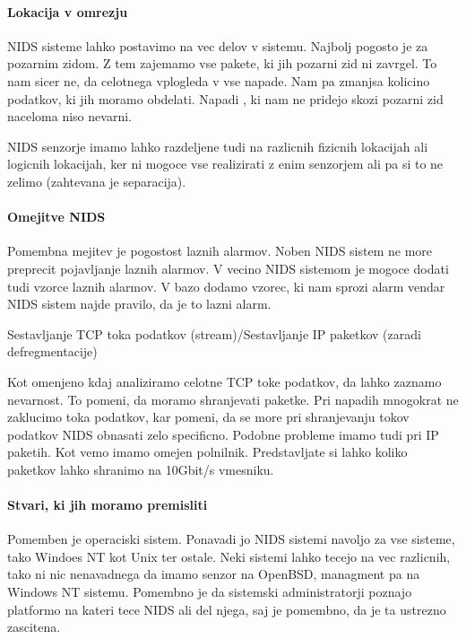 \documentclass[12pt]{article}
\begin{document}
\paragraph{Lokacija v omrezju} %
\label{par:Lokacija v omrezju}

NIDS sisteme lahko postavimo na vec delov v sistemu. Najbolj pogosto je za pozarnim zidom.
Z tem zajemamo vse pakete, ki jih pozarni zid ni zavrgel. To nam sicer ne, da celotnega vplogleda v vse napade.
Nam pa zmanjsa kolicino podatkov, ki jih moramo obdelati. Napadi , ki nam ne pridejo skozi pozarni zid naceloma niso nevarni.

NIDS senzorje imamo lahko razdeljene tudi na razlicnih fizicnih lokacijah ali logicnih lokacijah, ker ni mogoce vse realizirati z enim senzorjem ali pa si to ne zelimo (zahtevana je separacija).


\paragraph{Omejitve NIDS} %
\label{par:Omejitve NIDS}

Pomembna mejitev je pogostost laznih alarmov.
Noben NIDS sistem ne more preprecit pojavljanje laznih alarmov.
V vecino NIDS sistemom je mogoce dodati tudi vzorce laznih alarmov. 
V bazo dodamo vzorec, ki nam sprozi alarm vendar NIDS sistem najde pravilo, da je to lazni alarm.


Sestavljanje TCP toka podatkov (stream)/Sestavljanje IP paketkov (zaradi defregmentacije)

Kot omenjeno kdaj analiziramo celotne TCP toke podatkov, da lahko zaznamo nevarnost. To pomeni, da moramo shranjevati paketke. 
Pri napadih mnogokrat ne zaklucimo toka podatkov, kar pomeni, da se more pri shranjevanju tokov podatkov NIDS obnasati zelo specificno. Podobne probleme imamo tudi pri IP paketih. 
Kot vemo imamo omejen polnilnik. Predstavljate si lahko koliko paketkov lahko shranimo na 10Gbit/s vmesniku.

\paragraph{Stvari, ki jih moramo premisliti} %
\label{par:Stvari, ki jih moramo premisliti}


Pomemben je operaciski sistem. Ponavadi jo NIDS sistemi navoljo za vse sisteme,
tako Windoes NT kot Unix ter ostale. Neki sistemi lahko tecejo na vec razlicnih, tako ni nic nenavadnega
da imamo senzor na OpenBSD, managment pa na Windows NT sistemu.
Pomembno je da sistemski administratorji poznajo platformo na kateri tece NIDS ali del njega, saj je pomembno, da je ta ustrezno zascitena.
\end{document}
